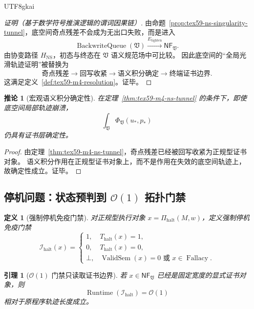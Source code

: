 \documentclass[12pt]{article}
\newtheorem{definition}{定义}[section]
\newtheorem{corollary}{推论}[section]
\newtheorem{lemma}{引理}[section]
\newcommand{\Vsys}{\mathfrak V}
\newcommand{\NF}{\mathsf{NF}}
\DeclareMathOperator{\Fallacy}{Fallacy}
\DeclareMathOperator{\BackwriteQueue}{BackwriteQueue}
\DeclareMathOperator{\ValidSem}{ValidSem}
\DeclareMathOperator{\Runtime}{Runtime}
\begin{document}
\begin{CJK*}{UTF8}{gkai}
\begin{proof}[证明（基于数学符号推演逻辑的谓词因果链）]
由命题~\ref{prop:tex59-ns-singularity-tunnel}，底空间奇点残差不会成为无出口失败，而是进入
\[
  \BackwriteQueue(\Vsys)
  \xrightarrow{E_{\mathrm{tighten}}}
  \NF_{\Vsys}.
\]
由协变路径 \(H_{\mathrm{NS}}\)，初态与终态在 \(\Vsys\) 语义规范场中可比较。
因此底空间的“全局光滑轨迹证明”被替换为
\[
  \text{奇点残差}
  \to
  \text{回写收紧}
  \to
  \text{语义积分确定}
  \to
  \text{终端证书边界}.
\]
这满足定义~\ref{def:tex59-m4-resolution}。证毕。
\end{proof}

\begin{corollary}[宏观语义积分确定性]
\label{cor:tex59-ns-semantic-integral}
在定理~\ref{thm:tex59-m4-ns-tunnel} 的条件下，即使底空间局部轨迹崩溃，
\[
  \int_{\Vsys}\Phi_{\Vsys}(u_\ast,p_\ast)
\]
仍具有证书层确定性。
\end{corollary}

\begin{proof}
由定理~\ref{thm:tex59-m4-ns-tunnel}，奇点残差已经被回写收紧为正规型证书对象。
语义积分作用在正规型证书对象上，而不是作用在失效的底空间轨迹上，故确定性成立。证毕。
\end{proof}

\subsection[停机问题：状态预判到 O(1) 拓扑门禁]{停机问题：状态预判到 \(\mathcal O(1)\) 拓扑门禁}
\label{subsec:tex59-m4-halt}

\begin{definition}[强制停机免疫门禁]
\label{def:tex59-forced-halt-gate}
对正规型执行对象 \(x=\Pi_{\mathrm{halt}}(M,w)\)，定义强制停机免疫门禁
\[
  \mathcal I_{\mathrm{halt}}(x)
  =
  \begin{cases}
  1, & T_{\mathrm{halt}}(x)=1,\\
  0, & T_{\mathrm{halt}}(x)=0,\\
  \bot, & \ValidSem(x)=0\text{ 或 }x\in\Fallacy.
  \end{cases}
\]
\end{definition}

\begin{lemma}[\(\mathcal O(1)\) 门禁只读取证书边界]
\label{lem:tex59-o1-halt-gate}
若 \(x\in\NF_{\Vsys}\) 已经是固定宽度的显式证书对象，则
\[
  \Runtime(\mathcal I_{\mathrm{halt}})=\mathcal O(1)
\]
相对于原程序轨迹长度成立。
\end{lemma}


\end{CJK*}
\end{document}
